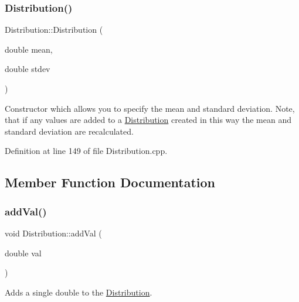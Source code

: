 \mbox{\label{class_world_architect_1_1_distribution_ae8b48b89df0dbc5d326b22789a014a3a}} 
\subsubsection{\texorpdfstring{Distribution()}{Distribution()}\hspace{0.1cm}{\footnotesize\ttfamily [2/2]}}
{\footnotesize\ttfamily Distribution\+::\+Distribution (\begin{DoxyParamCaption}\item[{double}]{mean,  }\item[{double}]{stdev }\end{DoxyParamCaption})}

Constructor which allows you to specify the mean and standard deviation. Note, that if any values are added to a \mbox{\hyperlink{class_world_architect_1_1_distribution}{Distribution}} created in this way the mean and standard deviation are recalculated. 

Definition at line 149 of file Distribution.\+cpp.



\subsection{Member Function Documentation}
\mbox{\label{class_world_architect_1_1_distribution_a406368b730c3a22d7cbc84d1a00f544e}} 
\subsubsection{\texorpdfstring{addVal()}{addVal()}}
{\footnotesize\ttfamily void Distribution\+::add\+Val (\begin{DoxyParamCaption}\item[{double}]{val }\end{DoxyParamCaption})}



Adds a single double to the \mbox{\hyperlink{class_world_architect_1_1_distribution}{Distribution}}. 



